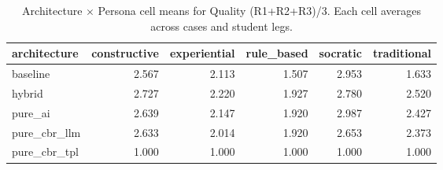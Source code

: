 \begin{table}[htbp]
\centering
\caption{Architecture $\times$ Persona cell means for Quality (R1+R2+R3)/3. Each cell averages across cases and student legs.}
\label{tab:cell-quality}
\begin{tabular}{lrrrrr}
\toprule
architecture & constructive & experiential & rule\_based & socratic & traditional \\
\midrule
baseline & 2.567 & 2.113 & 1.507 & 2.953 & 1.633 \\
hybrid & 2.727 & 2.220 & 1.927 & 2.780 & 2.520 \\
pure\_ai & 2.639 & 2.147 & 1.920 & 2.987 & 2.427 \\
pure\_cbr\_llm & 2.633 & 2.014 & 1.920 & 2.653 & 2.373 \\
pure\_cbr\_tpl & 1.000 & 1.000 & 1.000 & 1.000 & 1.000 \\
\bottomrule
\end{tabular}
\end{table}

